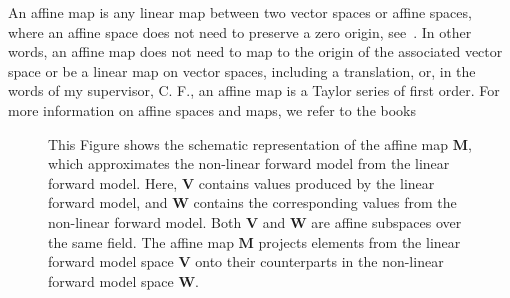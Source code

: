 An affine map is any linear map between two vector spaces or affine spaces, where an affine space does not need to preserve a zero origin, see~\cite[Def. 2.3.1]{berger2009geometry}.
In other words, an affine map does not need to map to the origin of the associated vector space or be a linear map on vector spaces, including a translation, or, in the words of my supervisor, C. F., an affine map is a Taylor series of first order.
For more information on affine spaces and maps, we refer to the books \cite{berger2009geometry, katsumi1994affine}
\begin{figure}[ht!]
	\centering
	\caption[Schematics of the affine map]{This Figure shows the schematic representation of the affine map $\bm{M}$, which approximates the non-linear forward model from the linear forward model. Here, $\bm{V}$ contains values produced by the linear forward model, and $\bm{W}$ contains the corresponding values from the non-linear forward model. Both $\bm{V}$ and $\bm{W}$ are affine subspaces over the same field. The affine map $\bm{M}$ projects elements from the linear forward model space $\bm{V}$ onto their counterparts in the non-linear forward model space $\bm{W}$.
	}
\end{figure}
\newcommand*{\vertbar}{\rule[-1ex]{0.5pt}{2.5ex}}
\newcommand*{\horzbar}{\rule[.5ex]{2.5ex}{0.5pt}}


